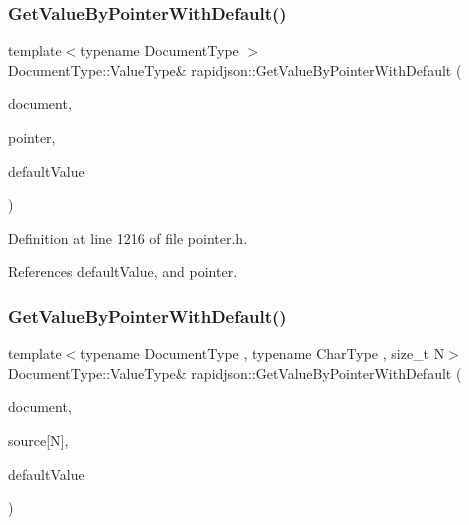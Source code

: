 \subsubsection{\texorpdfstring{GetValueByPointerWithDefault()}{GetValueByPointerWithDefault()}\hspace{0.1cm}{\footnotesize\ttfamily [6/8]}}
{\footnotesize\ttfamily template$<$typename Document\+Type $>$ \\
Document\+Type\+::\+Value\+Type\& rapidjson\+::\+Get\+Value\+By\+Pointer\+With\+Default (\begin{DoxyParamCaption}\item[{Document\+Type \&}]{document,  }\item[{const \mbox{\hyperlink{classrapidjson_1_1_generic_pointer}{Generic\+Pointer}}$<$ typename Document\+Type\+::\+Value\+Type $>$ \&}]{pointer,  }\item[{const typename Document\+Type\+::\+Ch $\ast$}]{default\+Value }\end{DoxyParamCaption})}



Definition at line 1216 of file pointer.\+h.


\begin{DoxyCode}{0}

\end{DoxyCode}


References default\+Value, and pointer.

\mbox{\label{namespacerapidjson_a82e20f8de529ed67a6533df54a31bb04}} 
\subsubsection{\texorpdfstring{GetValueByPointerWithDefault()}{GetValueByPointerWithDefault()}\hspace{0.1cm}{\footnotesize\ttfamily [7/8]}}
{\footnotesize\ttfamily template$<$typename Document\+Type , typename Char\+Type , size\+\_\+t N$>$ \\
Document\+Type\+::\+Value\+Type\& rapidjson\+::\+Get\+Value\+By\+Pointer\+With\+Default (\begin{DoxyParamCaption}\item[{Document\+Type \&}]{document,  }\item[{const Char\+Type(\&)}]{source\mbox{[}\+N\mbox{]},  }\item[{const typename Document\+Type\+::\+Value\+Type \&}]{default\+Value }\end{DoxyParamCaption})}



